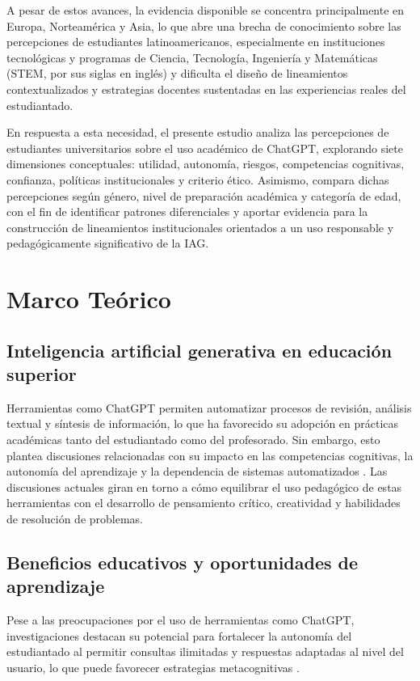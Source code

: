 \documentclass[spanish]{textolivre}
\begin{document}
A pesar de estos avances, la evidencia disponible se concentra principalmente en Europa, Norteamérica y Asia, lo que abre una brecha de conocimiento sobre las percepciones de estudiantes latinoamericanos, especialmente en instituciones tecnológicas y programas de Ciencia, Tecnología, Ingeniería y Matemáticas (STEM, por sus siglas en inglés) y dificulta el diseño de lineamientos contextualizados y estrategias docentes sustentadas en las experiencias reales del estudiantado.

En respuesta a esta necesidad, el presente estudio analiza las percepciones de estudiantes universitarios sobre el uso académico de ChatGPT, explorando siete dimensiones conceptuales: utilidad, autonomía, riesgos, competencias cognitivas, confianza, políticas institucionales y criterio ético. Asimismo, compara dichas percepciones según género, nivel de preparación académica y categoría de edad, con el fin de identificar patrones diferenciales y aportar evidencia para la construcción de lineamientos institucionales orientados a un uso responsable y pedagógicamente significativo de la IAG.

\section{Marco Teórico}

\subsection{Inteligencia artificial generativa en educación superior}
Herramientas como ChatGPT permiten automatizar procesos de revisión, análisis textual y síntesis de información, lo que ha favorecido su adopción en prácticas académicas tanto del estudiantado como del profesorado. Sin embargo, esto plantea discusiones relacionadas con su impacto en las competencias cognitivas, la autonomía del aprendizaje y la dependencia de sistemas automatizados \cite{Kasneci2023,RudolphTanTan2023}. Las discusiones actuales giran en torno a cómo equilibrar el uso pedagógico de estas herramientas con el desarrollo de pensamiento crítico, creatividad y habilidades de resolución de problemas.

\subsection{Beneficios educativos y oportunidades de aprendizaje}

Pese a las preocupaciones por el uso de herramientas como ChatGPT, investigaciones destacan su potencial para fortalecer la autonomía del estudiantado al permitir consultas ilimitadas y respuestas adaptadas al nivel del usuario, lo que puede favorecer estrategias metacognitivas \cite{Dempere2023}.
\end{document}
